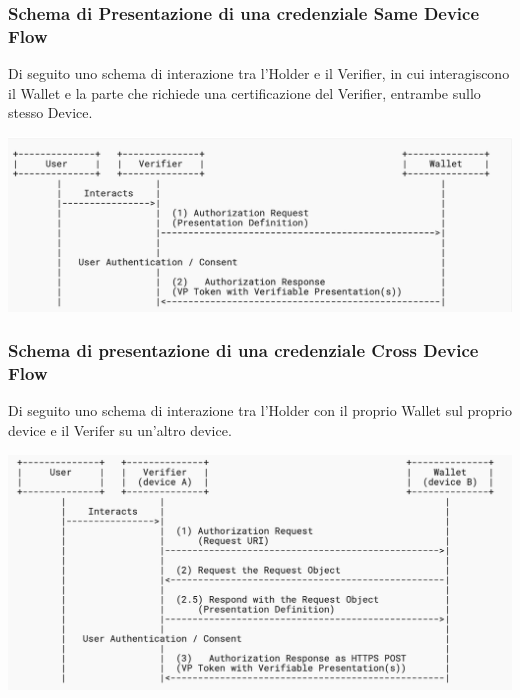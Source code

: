\subsubsection{Schema di Presentazione di una credenziale Same Device Flow}
Di seguito uno schema di interazione tra l'Holder e il Verifier, in cui interagiscono il Wallet e la parte che richiede una
certificazione del Verifier, entrambe sullo stesso Device.
\begin{center}
	\includegraphics[scale = 0.2]{./res/images/PresentationSameDevice.jpg}
\end{center}

\subsubsection{Schema di presentazione di una credenziale Cross Device Flow}
Di seguito uno schema di interazione tra l'Holder con il proprio Wallet sul proprio device e il Verifer su un'altro device.\\

\begin{center}
	\includegraphics[scale = 0.2]{./res/images/PresentationCrossDevice.jpg}
\end{center}

